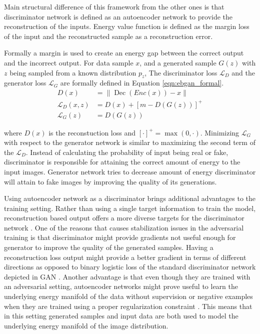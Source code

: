 Main structural difference of this framework from the other ones is that discriminator network is
defined as an autoencoder network to provide the reconstruction of the inputs. Energy value
function is defined as the margin loss of the input and the reconstructed sample
\cite{Zhao2016EnergybasedGA} as a reconstruction error. 

Formally a margin is used to create an energy gap between the correct output and the incorrect
output. For data sample $x$, and a generated sample $G(z)$ with $z$ being sampled from a known
distribution $p_z$, The discriminator loss $\mathcal{L}_{D}$ and the generator loss
$\mathcal{L}_{G}$ are formally defined in Equation \ref{eqn:ebgan_formal}.
\begin{equation}
\label{eqn:ebgan_formal}
\begin{aligned}D(x)&=\|\operatorname{Dec}(E n c(x))-x\|\\ \mathcal{L}_{D}(x, z) &=D(x)+[m-D(G(z))]^{+} \\ \mathcal{L}_{G}(z) &=D(G(z)) \end{aligned}
\end{equation}

where $D(x)$ is the reconstuction loss and  $[\cdot]^{+}=\max (0, \cdot)$. Minimizing
$\mathcal{L}_{G}$ with respect to the generator network is similar to maximizing the second term of the
$\mathcal{L}_{D}$. Instead of calculating the probability of input being real or fake,
discriminator is responsible for attaining the correct amount of energy to the input images. Generator network
tries to decrease amount of energy discriminator will attain to fake images by improving the quality of 
its generations.

Using autoencoder network as a discriminator brings additional advantages to the training setting.
Rather than using a single target information to train the model, reconstruction based output offers
a more diverse targets for the discriminator network \cite{Zhao2016EnergybasedGA}. One of the reasons that causes
stabilization issues in the adversarial training is that discriminator might provide gradients not
useful enough for generator to improve the quality of the generated samples. Having a reconstruction
loss output might provide a better gradient in terms of different directions \cite{Zhao2016EnergybasedGA} 
as opposed to binary logistic loss of the standard discriminator network depicted in 
GAN \cite{Goodfellow:2014:GAN:2969033.2969125}. Another advantage is that even though they are trained 
with an adversarial setting, autoencoder networks might prove useful to learn the underlying energy 
manifold of the data without supervision or negative examples when they are trained using a proper 
regularization constraint \cite{Zhao2016EnergybasedGA}. This means that in this setting generated 
samples and input data are both used to model the underlying energy manifold of the image distribution. 

